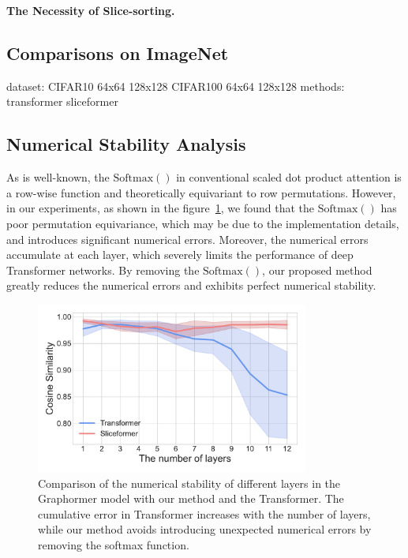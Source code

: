 \textbf{The Necessity of Slice-sorting.}


\subsection{Comparisons on ImageNet}
dataset: CIFAR10 64x64 128x128 CIFAR100 64x64 128x128
methods: transformer sliceformer

\subsection{Numerical Stability Analysis}
As is well-known, the $\text{Softmax}()$ in conventional scaled dot product attention is a row-wise function and theoretically equivariant to row permutations. 
However, in our experiments, as shown in the figure~\ref{fig:cos}, we found that the $\text{Softmax}()$ has poor permutation equivariance, which may be due to the implementation details, and introduces significant numerical errors. 
Moreover, the numerical errors accumulate at each layer, which severely limits the performance of deep Transformer networks. 
By removing the $\text{Softmax}()$, our proposed method greatly reduces the numerical errors and exhibits perfect numerical stability.

\begin{figure}
  \centering
    \includegraphics[width=0.8\textwidth]{figures/cos_sim.pdf}
    \caption{Comparison of the numerical stability of different layers in the Graphormer model with our method and the Transformer. The cumulative error in Transformer increases with the number of layers, while our method avoids introducing unexpected numerical errors by removing the softmax function.}
    \label{fig:cos}
\end{figure}

